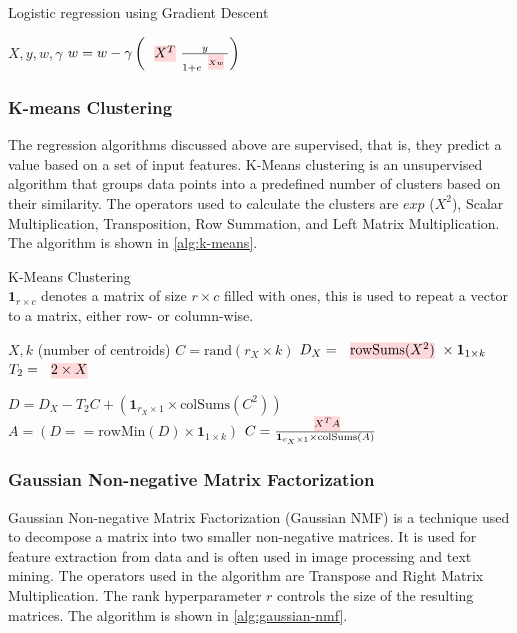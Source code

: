 \begin{algorithm}[ht]
  \caption[Linear regression]{Logistic regression using Gradient Descent
    ~\cite{morpheus}}\label{alg:logistic-regression}
  \begin{algorithmic}
    \Require $X, y , w, \gamma$
    \State $w = w - \gamma \left(\text{\red{$X^T$}} \frac{y}{1+e^{\text{\red{$X w$}}}}\right)$
    \EndFor
  \end{algorithmic}
\end{algorithm}

\subsubsection{K-means Clustering}
The regression algorithms discussed above are supervised, that is, they predict a value based on a set of input features. K-Means clustering is an unsupervised algorithm that groups data points into a predefined number of clusters based on their similarity. The operators used to calculate the clusters are $exp$ ($X^2$), Scalar Multiplication, Transposition, Row Summation, and Left Matrix Multiplication. The algorithm is shown in \autoref{alg:k-means}.

\begin{algorithm}[ht]
  \caption[K-Means Clustering]{K-Means Clustering
    ~\cite{morpheus}\\
    $\mathbf{1}_{r \times c}$ denotes a matrix of size $r \times c$ filled with ones, this is used to repeat a vector to a matrix, either row- or column-wise.}\label{alg:k-means}
  \begin{algorithmic}
    \Require $X, k$ (number of centroids)
    \State $C = \text{rand}(r_X \times k)$ 
    \State $D_X = \text{\red{rowSums($X^2$)}} \times \mathbf{1}_{1 \times k}$ 
    \State $T_2 = \text{\red{$2 \times X$}}$

    \State $D = D_X - T_2C + \left( \mathbf{1}_{r_X\times 1} \times \text{colSums}(C^2) \right)$ 
    \State $A = (D == \text{rowMin}(D) \times \mathbf{1}_{1 \times k})$ 
    \State $C =\frac{\text{\red{$X^T A$}}}{\mathbf{1}_{c_X \times 1} \times \text{colSums}(A)}$ 
    \EndFor
  \end{algorithmic}
\end{algorithm}

\subsubsection{Gaussian Non-negative Matrix Factorization}
Gaussian Non-negative Matrix Factorization (Gaussian NMF) is a technique used to decompose a matrix into two smaller non-negative matrices. It is used for feature extraction from data and is often used in image processing and text mining. The operators used in the algorithm are Transpose and Right Matrix Multiplication. The rank hyperparameter $r$ controls the size of the resulting matrices. The algorithm is shown in \autoref{alg:gaussian-nmf}.

